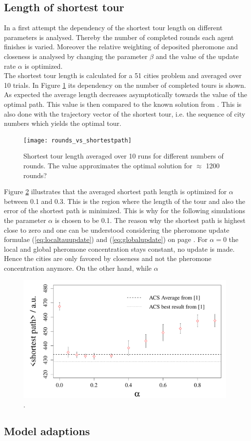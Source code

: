 

\subsection{Length of shortest tour}

In a first attempt the dependency of the shortest tour length on different parameters is analysed. Thereby the number of completed rounds each agent finishes is varied. Moreover the relative weighting of deposited pheromone and closeness is analysed by changing the parameter $\beta$ and the value of the update rate $\alpha$ is optimized. \\
The shortest tour length is calculated for a 51 cities problem and averaged over 10 trials. In Figure \ref{fig:roundsp} its dependency on the number of completed tours is shown. As expected the average length decreases asymptotically towards the value of the optimal path. This value is then compared to the known solution from \cite{web:data}. This is also done with the trajectory vector of the shortest tour, i.e. the sequence of city numbers which yields the optimal tour.

\begin{figure}[h!]
\begin{center}
\texttt{[image: rounds\_vs\_shortestpath]}
\caption{Shortest tour length averaged over 10 runs for different numbers of rounds. The value approximates the optimal solution for $\approx$ 1200 rounds?}
\label{fig:roundsp}
\end{center}
\end{figure}

Figure \ref{fig:alphasp} illustrates that the averaged shortest path length is optimized for $\alpha$ between 0.1 and 0.3. This is the region where the length of the tour and also the error of the shortest path is minimized. This is why for the following simulations the parameter $\alpha$ is chosen to be 0.1. The reason why the shortest path is highest close to zero and one can be understood considering the pheromone update formulae (\ref{eq:localtauupdate}) and (\ref{eq:globalupdate}) on page \pageref{sec:model}. For $\alpha=0$ the local and global pheromone concentration stays constant, no update is made. Hence the cities are only favored by closeness and not the pheromone concentration anymore. On the other hand, while $\alpha$ 

\begin{figure}[h!]
\begin{center}
\includegraphics[width=11cm, height= 6 cm]{alpha_vs_shortestpath}
\caption{.}
\label{fig:alphasp}
\end{center}
\end{figure}

\subsection{Model adaptions}

